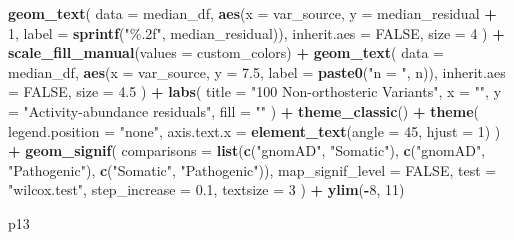 \documentclass[
]{article}
\newenvironment{Shaded}{\begin{snugshade}}{\end{snugshade}}
\newcommand{\AttributeTok}[1]{\textcolor[rgb]{0.13,0.29,0.53}{#1}}
\newcommand{\ConstantTok}[1]{\textcolor[rgb]{0.56,0.35,0.01}{#1}}
\newcommand{\DecValTok}[1]{\textcolor[rgb]{0.00,0.00,0.81}{#1}}
\newcommand{\FloatTok}[1]{\textcolor[rgb]{0.00,0.00,0.81}{#1}}
\newcommand{\FunctionTok}[1]{\textcolor[rgb]{0.13,0.29,0.53}{\textbf{#1}}}
\newcommand{\NormalTok}[1]{#1}
\newcommand{\SpecialCharTok}[1]{\textcolor[rgb]{0.81,0.36,0.00}{\textbf{#1}}}
\newcommand{\StringTok}[1]{\textcolor[rgb]{0.31,0.60,0.02}{#1}}
\begin{document}
\begin{Shaded}
\begin{Highlighting}[]
  \FunctionTok{geom\_text}\NormalTok{(}
    \AttributeTok{data =}\NormalTok{ median\_df,}
    \FunctionTok{aes}\NormalTok{(}\AttributeTok{x =}\NormalTok{ var\_source, }\AttributeTok{y =}\NormalTok{ median\_residual }\SpecialCharTok{+} \DecValTok{1}\NormalTok{, }\AttributeTok{label =} \FunctionTok{sprintf}\NormalTok{(}\StringTok{"\%.2f"}\NormalTok{, median\_residual)),}
    \AttributeTok{inherit.aes =} \ConstantTok{FALSE}\NormalTok{,}
    \AttributeTok{size =} \DecValTok{4}
\NormalTok{  ) }\SpecialCharTok{+}
  \FunctionTok{scale\_fill\_manual}\NormalTok{(}\AttributeTok{values =}\NormalTok{ custom\_colors) }\SpecialCharTok{+}
  \FunctionTok{geom\_text}\NormalTok{(}
    \AttributeTok{data =}\NormalTok{ median\_df,}
    \FunctionTok{aes}\NormalTok{(}\AttributeTok{x =}\NormalTok{ var\_source, }\AttributeTok{y =} \FloatTok{7.5}\NormalTok{, }\AttributeTok{label =} \FunctionTok{paste0}\NormalTok{(}\StringTok{"n = "}\NormalTok{, n)),}
    \AttributeTok{inherit.aes =} \ConstantTok{FALSE}\NormalTok{,}
    \AttributeTok{size =} \FloatTok{4.5}
\NormalTok{  ) }\SpecialCharTok{+}
  \FunctionTok{labs}\NormalTok{(}
    \AttributeTok{title =} \StringTok{"100 Non{-}orthosteric Variants"}\NormalTok{,}
    \AttributeTok{x =} \StringTok{""}\NormalTok{,}
    \AttributeTok{y =} \StringTok{"Activity{-}abundance residuals"}\NormalTok{,}
    \AttributeTok{fill =} \StringTok{""}
\NormalTok{  ) }\SpecialCharTok{+}
  \FunctionTok{theme\_classic}\NormalTok{() }\SpecialCharTok{+}
  \FunctionTok{theme}\NormalTok{(}
    \AttributeTok{legend.position =} \StringTok{"none"}\NormalTok{,}
    \AttributeTok{axis.text.x =} \FunctionTok{element\_text}\NormalTok{(}\AttributeTok{angle =} \DecValTok{45}\NormalTok{, }\AttributeTok{hjust =} \DecValTok{1}\NormalTok{)}
\NormalTok{  ) }\SpecialCharTok{+}
  \FunctionTok{geom\_signif}\NormalTok{(}
    \AttributeTok{comparisons =} \FunctionTok{list}\NormalTok{(}\FunctionTok{c}\NormalTok{(}\StringTok{"gnomAD"}\NormalTok{, }\StringTok{"Somatic"}\NormalTok{), }
                       \FunctionTok{c}\NormalTok{(}\StringTok{"gnomAD"}\NormalTok{, }\StringTok{"Pathogenic"}\NormalTok{), }
                       \FunctionTok{c}\NormalTok{(}\StringTok{"Somatic"}\NormalTok{, }\StringTok{"Pathogenic"}\NormalTok{)),}
    \AttributeTok{map\_signif\_level =} \ConstantTok{FALSE}\NormalTok{,}
    \AttributeTok{test =} \StringTok{"wilcox.test"}\NormalTok{,}
    \AttributeTok{step\_increase =} \FloatTok{0.1}\NormalTok{,}
    \AttributeTok{textsize =} \DecValTok{3}
\NormalTok{  ) }\SpecialCharTok{+} \FunctionTok{ylim}\NormalTok{(}\SpecialCharTok{{-}}\DecValTok{8}\NormalTok{, }\DecValTok{11}\NormalTok{)}

\NormalTok{p13}
\end{Highlighting}
\end{Shaded}
\end{document}

